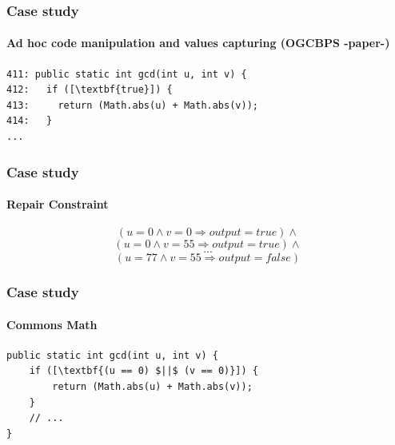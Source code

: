 \documentclass{beamer}
\begin{document}
 \begin{frame}[fragile]
    \frametitle{Case study}
      \framesubtitle{Ad hoc code manipulation and values capturing (OGCBPS -paper-)}
\begin{lstlisting}[escapeinside=\[\]]
411: public static int gcd(int u, int v) {
412:   if ([\textbf{true}]) {
413:     return (Math.abs(u) + Math.abs(v));
414:   }
...
\end{lstlisting}
\end{frame}

  \frame
  {  
  \frametitle{Case study}
      \framesubtitle{Repair Constraint}
\begin{equation*}
 (u=0\wedge v=0 \Rightarrow output=true) \wedge
\end{equation*}
\begin{equation*}
 (u=0\wedge v=55 \Rightarrow output=true) \wedge 
\end{equation*}
\begin{equation*}
...
\end{equation*}
\begin{equation*}
 (u=77\wedge v=55 \Rightarrow output=false)
\end{equation*}
}

 \begin{frame}[fragile]
    \frametitle{Case study}
      \framesubtitle{Commons Math}
        \begin{lstlisting}[escapeinside=\[\]]
public static int gcd(int u, int v) {
    if ([\textbf{(u == 0) $||$ (v == 0)}]) {
        return (Math.abs(u) + Math.abs(v));
    }
    // ...
}
	\end{lstlisting}
\end{frame}
\end{document}

